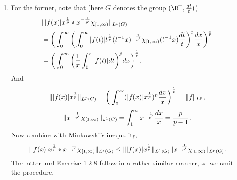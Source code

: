 \begin{enumerate}
\item[1.2.7.]
   For the former, note that (here $G$ denotes the group $(\R^{+},\frac{dt}{t})$)
   \begin{equation*}\begin{aligned}
   &\Vert |f(x)|x^{\frac{1}{p}}*x^{-\frac{1}{p'}}\chi_{[1,\infty)} \Vert_{L^{p}(G)}\\
   &= \bigg(\int_{0}^{\infty}\bigg(\int_{0}^{\infty}
   |f(t)|t^{\frac{1}{p}}(t^{-1}x)^{-\frac{1}{p'}}\chi_{[1,\infty)}(t^{-1}x)
   \frac{dt}{t}\bigg)^{p}\frac{dx}{x}\bigg)^{\frac{1}{p}}\\
   &=\bigg(\int_{0}^{\infty}\bigg(\frac{1}{x}\int_{0}^{x}
   |f(t)|dt\bigg)^{p}dx\bigg)^{\frac{1}{p}}.
   \end{aligned}\end{equation*}
   And
   \begin{equation*}\begin{aligned}
   \Vert |f(x)|x^{\frac{1}{p}} \Vert_{L^{p}(G)}=\bigg(\int_{0}^{\infty}(|f(x)|x^{\frac{1}{p}})^{p}\frac{dx}{x}\bigg)^{\frac{1}{p}}=\Vert f \Vert_{L^p},
   \end{aligned}\end{equation*}
   \begin{equation*}\begin{aligned}
   \Vert x^{-\frac{1}{p'}}\chi_{[1,\infty)} \Vert_{L^{1}(G)}
   =\int_{1}^{\infty}x^{-\frac{1}{p'}}\frac{dx}{x}=\frac{p}{p-1}.
   \end{aligned}\end{equation*}
   Now combine with Minkowski's inequality,
   \begin{equation*}\begin{aligned}
   \Vert |f(x)|x^{\frac{1}{p}}*x^{-\frac{1}{p'}}\chi_{[1,\infty)} \Vert_{L^{p}(G)} \leq
   \Vert |f(x)|x^{\frac{1}{p}} \Vert_{L^{1}(G)}
   \Vert x^{-\frac{1}{p'}}\chi_{[1,\infty)} \Vert_{L^{p}(G)}.
   \end{aligned}\end{equation*}
   The latter and Exercise 1.2.8 follow in a rather similar manner, so we omit the procedure.


\end{enumerate}
